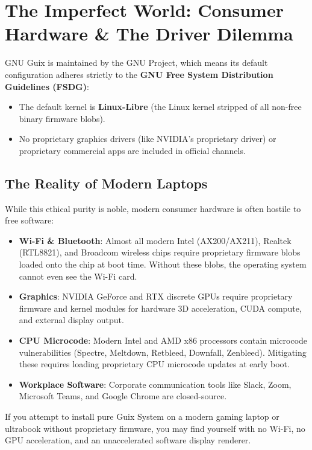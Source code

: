 \section{The Imperfect World: Consumer Hardware \& The Driver Dilemma}

GNU Guix is maintained by the GNU Project, which means its default configuration adheres strictly to the \textbf{GNU Free System Distribution Guidelines (FSDG)}:
\begin{itemize}
  \item The default kernel is \textbf{Linux-Libre} (the Linux kernel stripped of all non-free binary firmware blobs).
  \item No proprietary graphics drivers (like NVIDIA's proprietary driver) or proprietary commercial apps are included in official channels.
\end{itemize}

\subsection{The Reality of Modern Laptops}

While this ethical purity is noble, modern consumer hardware is often hostile to free software:
\begin{itemize}
  \item \textbf{Wi-Fi \& Bluetooth}: Almost all modern Intel (AX200/AX211), Realtek (RTL8821), and Broadcom wireless chips require proprietary firmware blobs loaded onto the chip at boot time. Without these blobs, the operating system cannot even see the Wi-Fi card.
  \item \textbf{Graphics}: NVIDIA GeForce and RTX discrete GPUs require proprietary firmware and kernel modules for hardware 3D acceleration, CUDA compute, and external display output.
  \item \textbf{CPU Microcode}: Modern Intel and AMD x86 processors contain microcode vulnerabilities (Spectre, Meltdown, Retbleed, Downfall, Zenbleed). Mitigating these requires loading proprietary CPU microcode updates at early boot.
  \item \textbf{Workplace Software}: Corporate communication tools like Slack, Zoom, Microsoft Teams, and Google Chrome are closed-source.
\end{itemize}

If you attempt to install pure Guix System on a modern gaming laptop or ultrabook without proprietary firmware, you may find yourself with no Wi-Fi, no GPU acceleration, and an unaccelerated software display renderer.

